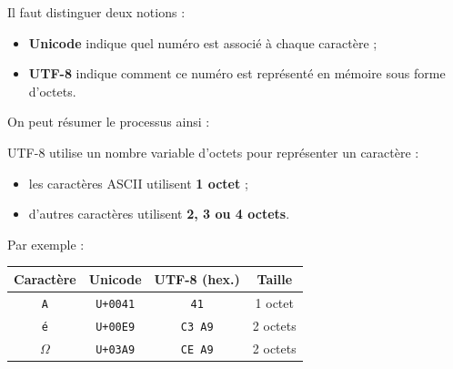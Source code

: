 \documentclass[11pt, a4paper]{book}
\begin{document}
Il faut distinguer deux notions :

\begin{itemize}
    \item \textbf{Unicode} indique quel numéro est associé à chaque caractère ;

    \item \textbf{UTF-8} indique comment ce numéro est représenté en mémoire
    sous forme d'octets.
\end{itemize}

On peut résumer le processus ainsi :

\begin{center}
\end{center}

UTF-8 utilise un nombre variable d'octets pour représenter un caractère :

\begin{itemize}
    \item les caractères ASCII utilisent \textbf{1 octet} ;
    \item d'autres caractères utilisent \textbf{2, 3 ou 4 octets}.
\end{itemize}

Par exemple :

\begin{center}
\renewcommand{\arraystretch}{1.25}
\begin{tabular}{cccc}
\toprule
\textbf{Caractère} &
\textbf{Unicode} &
\textbf{UTF-8 (hex.)} &
\textbf{Taille} \\
\midrule
\texttt{A} & \texttt{U+0041} & \texttt{41} & 1 octet \\
\texttt{é} & \texttt{U+00E9} & \texttt{C3 A9} & 2 octets \\
$\Omega$   & \texttt{U+03A9} & \texttt{CE A9} & 2 octets \\
\bottomrule
\end{tabular}
\end{center}
\end{document}
